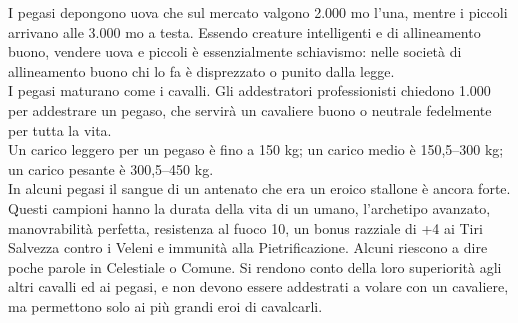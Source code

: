 \begin{multicols}{2}
I pegasi depongono uova che sul mercato valgono 2.000 mo l’una, mentre i piccoli arrivano alle 3.000 mo a testa. Essendo creature intelligenti e di allineamento buono, vendere uova e piccoli è essenzialmente schiavismo: nelle società di allineamento buono chi lo fa è disprezzato o punito dalla legge.\\

I pegasi maturano come i cavalli. Gli addestratori professionisti chiedono 1.000 per addestrare un pegaso, che servirà un cavaliere buono o neutrale fedelmente per tutta la vita.\\

Un carico leggero per un pegaso è fino a 150 kg; un carico medio è 150,5–300 kg; un carico pesante è 300,5–450 kg.\\

In alcuni pegasi il sangue di un antenato che era un eroico stallone è ancora forte. Questi campioni hanno la durata della vita di un umano, l’archetipo avanzato, manovrabilità perfetta, resistenza al fuoco 10, un bonus razziale di +4 ai Tiri Salvezza contro i Veleni e immunità alla Pietrificazione. Alcuni riescono a dire poche parole in Celestiale o Comune. Si rendono conto della loro superiorità agli altri cavalli ed ai pegasi, e non devono essere addestrati a volare con un cavaliere, ma permettono solo ai più grandi eroi di cavalcarli.\\


\end{multicols}
